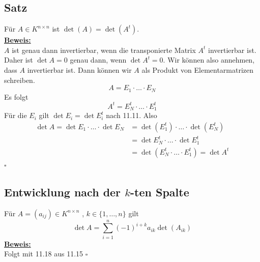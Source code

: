 \subsection{Satz} %
\label{sub:satz}
Für $A \in K^{n \times n}$ ist $\det (A)= \det(A^t)$.
\vspace{\baselineskip} \\
\underline{\textbf{Beweis:}} \\
$A$ ist genau dann invertierbar, wenn die transponierte Matrix $A^t$ invertierbar ist. Daher ist $\det A= 0$ genau dann, wenn $\det A^t = 0$. Wir können also 
annehmen, dass $A$ invertierbar ist. Dann können wir $A$ als Produkt von Elementarmatrizen schreiben.
\[
	A= E_1 \cdot \ldots \cdot E_N
\]
Es folgt
\[
	A^t = E^t_N \cdot \ldots \cdot E^t_1
\]
Für die $E_i$ gilt $\det E_i = \det E^t_i$ nach 11.11. Also
\begin{align*}
	\det A  =\det E_1 \cdot \ldots \cdot \det E_N &= \det (E^t_1) \cdot \ldots \cdot \det (E^t_N) \\
	&= \det E_N^t \cdot \ldots \cdot \det E_1^t \\
	&= \det (E_N^t \cdot \ldots \cdot E_1^t) = \det A^t
\end{align*}
\hfill \( \square \)

\subsection{Entwicklung nach der $k$-ten Spalte} %
\label{sub:entwicklung_nach_der_k_ten_spalte}
Für $A = (a_{ij}) \in K^{n \times n}$ , $k \in \{1, \ldots , n \}$ gilt
\[
	\det A = \sum\limits_{i=1}^{n} (-1)^{i+k} a_{ik} \det (A_{ik})
\]
\underline{\textbf{Beweis:}} \\
Folgt mit 11.18 aus 11.15 \hfill \( \square \)

